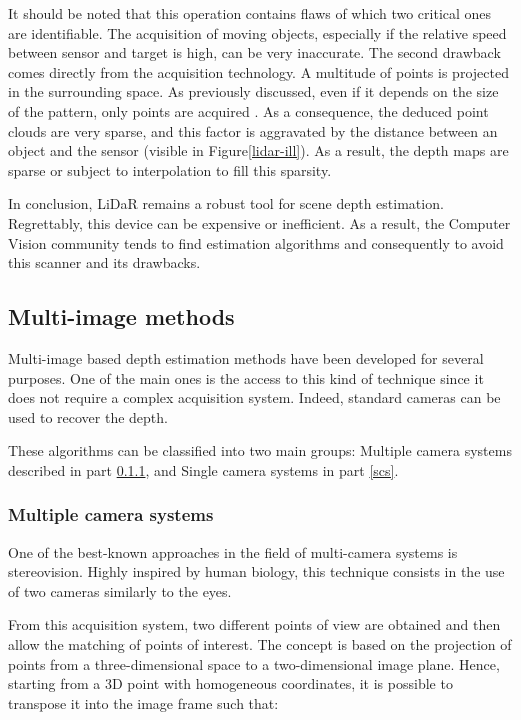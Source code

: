 It should be noted that this operation contains flaws of which two critical ones are identifiable. The acquisition of moving objects, especially if the relative speed between sensor and target is high, can be very inaccurate. The second drawback comes directly from the acquisition technology. A multitude of points is projected in the surrounding space. As previously discussed, even if it depends on the size of the pattern, only points are acquired \cite{vaze2007high}. As a consequence, the deduced point clouds are very sparse, and this factor is aggravated by the distance between an object and the sensor (visible in Figure\ref{lidar-ill}). As a result, the depth maps are sparse or subject to interpolation to fill this sparsity.

In conclusion, LiDaR remains a robust tool for scene depth estimation. Regrettably, this device can be expensive or inefficient. As a result, the Computer Vision community tends to find estimation algorithms and consequently to avoid this scanner and its drawbacks.

\subsection{Multi-image methods}\label{multi-im}

Multi-image based depth estimation methods have been developed for several purposes. One of the main ones is the access to this kind of technique since it does not require a complex acquisition system. Indeed, standard cameras can be used to recover the depth. 

These algorithms can be classified into two main groups: Multiple camera systems described in part \ref{mcs}, and Single camera systems in part \ref{scs}.

\subsubsection{Multiple camera systems}\label{mcs}
One of the best-known approaches in the field of multi-camera systems is stereovision. Highly inspired by human biology\cite{marr1979computational}, this technique consists in the use of two cameras similarly to the eyes.

From this acquisition system, two different points of view are obtained and then allow the matching of points of interest. The concept is based on the projection of points from a three-dimensional space to a two-dimensional image plane.
Hence, starting from a 3D point with homogeneous coordinates, it is possible to transpose it into the image frame such that:

